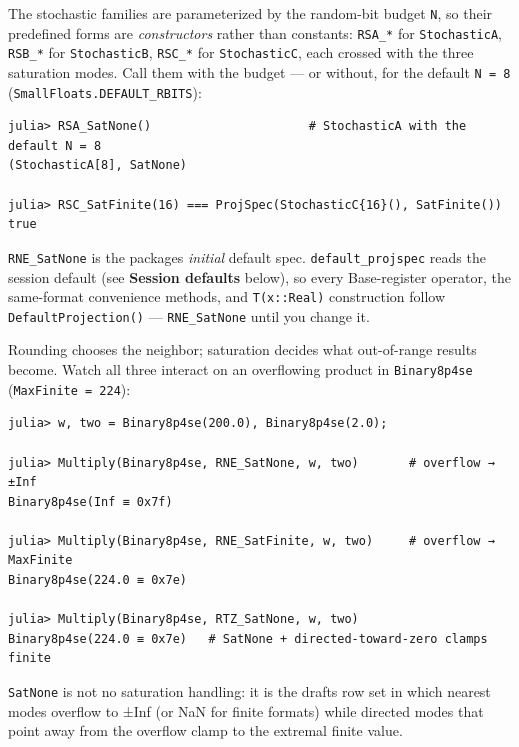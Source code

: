 The stochastic families are parameterized by the random-bit budget \texttt{N}, so their predefined forms are \emph{constructors} rather than constants: \texttt{RSA\_*} for \texttt{StochasticA}, \texttt{RSB\_*} for \texttt{StochasticB}, \texttt{RSC\_*} for \texttt{StochasticC}, each crossed with the three saturation modes. Call them with the budget — or without, for the default \texttt{N = 8} (\texttt{SmallFloats.DEFAULT\_RBITS}):




\begin{verbatim}
julia> RSA_SatNone()                      # StochasticA with the default N = 8
(StochasticA[8], SatNone)

julia> RSC_SatFinite(16) === ProjSpec(StochasticC{16}(), SatFinite())
true
\end{verbatim}



\texttt{RNE\_SatNone} is the package{\textquotesingle}s \emph{initial} default spec. \texttt{default\_projspec} reads the session default (see \textbf{Session defaults} below), so every Base-register operator, the same-format convenience methods, and \texttt{T(x::Real)} construction follow \texttt{DefaultProjection()} — \texttt{RNE\_SatNone} until you change it.



Rounding chooses the neighbor; saturation decides what out-of-range results become. Watch all three interact on an overflowing product in \texttt{Binary8p4se} (\texttt{MaxFinite = 224}):




\begin{verbatim}
julia> w, two = Binary8p4se(200.0), Binary8p4se(2.0);

julia> Multiply(Binary8p4se, RNE_SatNone, w, two)       # overflow → ±Inf
Binary8p4se(Inf ≡ 0x7f)

julia> Multiply(Binary8p4se, RNE_SatFinite, w, two)     # overflow → MaxFinite
Binary8p4se(224.0 ≡ 0x7e)

julia> Multiply(Binary8p4se, RTZ_SatNone, w, two)
Binary8p4se(224.0 ≡ 0x7e)   # SatNone + directed-toward-zero clamps finite
\end{verbatim}



\begin{tcolorbox}[toptitle=-1mm,bottomtitle=1mm,colback=admonition-note!50!white,colframe=admonition-note,title=\textbf{Note}]
\texttt{SatNone} is not {\textquotedbl}no saturation handling{\textquotedbl}: it is the draft{\textquotesingle}s row set in which nearest modes overflow to ±Inf (or NaN for finite formats) while directed modes that point away from the overflow clamp to the extremal finite value.

\end{tcolorbox}


